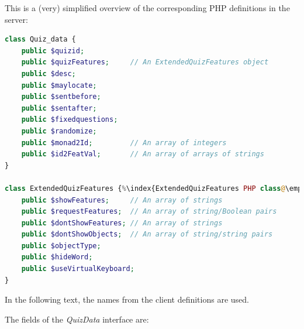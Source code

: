 \documentclass[11pt,oneside,a4paper]{memoir}
\begin{document}
This is a (very) simplified overview of the corresponding PHP definitions in the server:

\begin{lstlisting}[language=PHP]
class Quiz_data {
    public $quizid;
    public $quizFeatures;     // An ExtendedQuizFeatures object
    public $desc;
    public $maylocate;
    public $sentbefore;
    public $sentafter;
    public $fixedquestions;
    public $randomize;
    public $monad2Id;         // An array of integers
    public $id2FeatVal;       // An array of arrays of strings
}

class ExtendedQuizFeatures {%\index{ExtendedQuizFeatures PHP class@\emph{ExtendedQuizFeatures} PHP class}%
    public $showFeatures;     // An array of strings
    public $requestFeatures;  // An array of string/Boolean pairs
    public $dontShowFeatures; // An array of strings
    public $dontShowObjects;  // An array of string/string pairs
    public $objectType;
    public $hideWord;
    public $useVirtualKeyboard;
}
\end{lstlisting}

In the following text, the names from the client definitions are used.

The fields of the \emph{QuizData} interface are:
\end{document}
